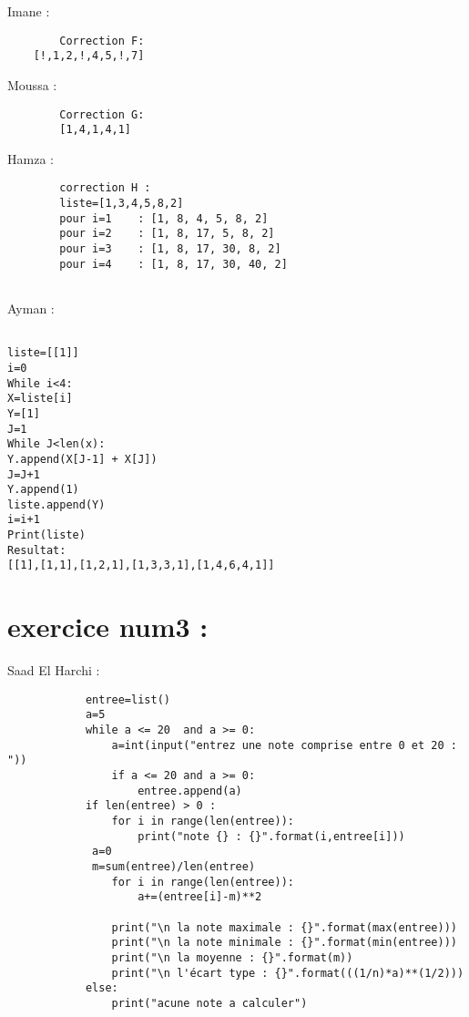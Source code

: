 \documentclass{article}
\begin{document}
	\begin{center}
    		Imane :
        \end{center} 
	
	\begin{verbatim}
		Correction F:
	[!,1,2,!,4,5,!,7]

	\end{verbatim}
	
    	\begin{center}
    		Moussa :
	\end{center} 
	
	\begin{verbatim}
		Correction G:
		[1,4,1,4,1]
	\end{verbatim}

    	\begin{center}
    		Hamza :
	\end{center} 
	\begin{verbatim}
		correction H :
		liste=[1,3,4,5,8,2]
		pour i=1    : [1, 8, 4, 5, 8, 2]
		pour i=2    : [1, 8, 17, 5, 8, 2]
		pour i=3    : [1, 8, 17, 30, 8, 2]
		pour i=4    : [1, 8, 17, 30, 40, 2]
		
	\end{verbatim}

	\begin{center}
    		Ayman :
	\end{center} 
	\begin{verbatim}
	
liste=[[1]]
i=0
While i<4:
X=liste[i]
Y=[1]
J=1
While J<len(x):
Y.append(X[J-1] + X[J])
J=J+1
Y.append(1)
liste.append(Y)
i=i+1
Print(liste)
Resultat:
[[1],[1,1],[1,2,1],[1,3,3,1],[1,4,6,4,1]]
\end{verbatim}
\section{exercice num3 :}
        \begin{center}
    		Saad El Harchi :
	\end{center}    	  
        	
    	\begin{lstlisting}
			entree=list()
			a=5
			while a <= 20  and a >= 0:
    			a=int(input("entrez une note comprise entre 0 et 20 : "))
    			if a <= 20 and a >= 0:
        			entree.append(a) 
			if len(entree) > 0 :
    			for i in range(len(entree)):
        			print("note {} : {}".format(i,entree[i]))
   			 a=0
   			 m=sum(entree)/len(entree)
    			for i in range(len(entree)):
        			a+=(entree[i]-m)**2
    
    			print("\n la note maximale : {}".format(max(entree)))
    			print("\n la note minimale : {}".format(min(entree)))
    			print("\n la moyenne : {}".format(m))
    			print("\n l'écart type : {}".format(((1/n)*a)**(1/2)))
			else:
    			print("acune note a calculer")
		\end{lstlisting}
\end{document}
